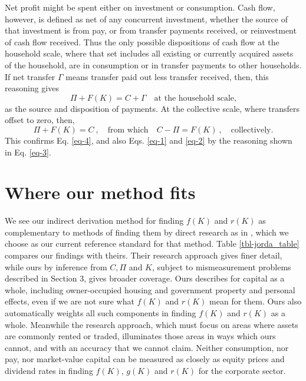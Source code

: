 Net profit might be spent either on investment or consumption. Cash flow, however, is defined as net of any concurrent investment, whether the source of that investment is from pay, or from transfer payments received, or reinvestment of cash flow received. Thus the only possible dispositions of cash flow at the household scale, where that set includes all existing or currently acquired assets of the household, are in consumption or in transfer payments to other households. If net transfer $\Gamma$ means transfer paid out less transfer received, then, this reasoning gives
\begin{equation}
\Pi + F(K) = C + \Gamma \quad \text{at the household scale,} \label{eq-13}
\end{equation}
as the source and disposition of payments. At the collective scale, where transfers offset to zero, then, 
\begin{equation}
\Pi + F(K) = C \ , \quad \text{from which} \quad C - \Pi = F(K) \ , \quad \text{collectively.} \label{eq-14}
\end{equation}
This confirms Eq. \eqref{eq-4}, and also Eqs. \eqref{eq-1} and \eqref{eq-2} by the reasoning shown in Eq. \eqref{eq-3}.

\section{Where our method fits}

We see our indirect derivation method for finding \(f(K)\) and \(r(K)\) as complementary to methods of finding them by direct research as in \cite{jorda2019}, which we choose as our current reference standard for that method. Table \ref{tbl-jorda_table} compares our findings with theirs. Their research approach gives finer detail, while ours by inference from \(C,\Pi\) and \(K\), subject to mismeasurement problems described in Section 3, gives broader coverage. Ours describes for capital as a whole, including owner-occupied housing and government property and personal effects, even if we are not sure what \(f(K)\) and \(r(K)\) mean for them. Ours also automatically weights all such components in finding \(f(K)\) and \(r(K)\) as a whole. Meanwhile the research approach, which must focus on areas where assets are commonly rented or traded, illuminates those areas in ways which ours cannot, and with an accuracy that we cannot claim. Neither consumption, nor pay, nor market-value capital can be measured as closely as equity prices and dividend rates in finding \(f(K)\), \(g(K)\) and \(r(K)\) for the corporate sector.

